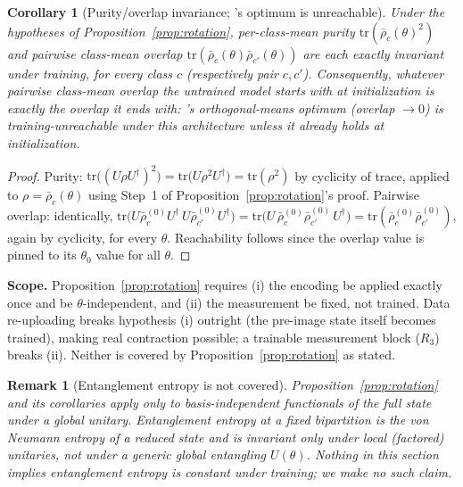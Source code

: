 \documentclass[pdflatex,sn-mathphys-ay]{sn-jnl}
\theoremstyle{thmstyleone}
\newtheorem{corollary}[theorem]{Corollary}
\theoremstyle{thmstyletwo}
\newtheorem{remark}{Remark}
\begin{document}
\begin{corollary}[Purity/overlap invariance; \citeauthor{du2023}'s optimum is unreachable]
\label{cor:purity}
Under the hypotheses of Proposition~\ref{prop:rotation}, per-class-mean purity $\mathrm{tr}(\bar\rho_c(\theta)^2)$ and pairwise class-mean overlap $\mathrm{tr}(\bar\rho_c(\theta)\bar\rho_{c'}(\theta))$ are each exactly invariant under training, for every class $c$ (respectively pair $c,c'$). Consequently, whatever pairwise class-mean overlap the untrained model starts with at initialization is exactly the overlap it ends with: \citeauthor{du2023}'s orthogonal-means optimum (overlap $\to 0$) is \emph{training-unreachable} under this architecture unless it already holds at initialization.
\end{corollary}
\begin{proof}
Purity: $\mathrm{tr}\big((U\rho U^\dagger)^2\big) = \mathrm{tr}\big(U\rho^2 U^\dagger\big) = \mathrm{tr}(\rho^2)$ by cyclicity of trace, applied to $\rho=\bar\rho_c(\theta)$ using Step~1 of Proposition~\ref{prop:rotation}'s proof. Pairwise overlap: identically, $\mathrm{tr}\big(U\bar\rho_c^{(0)}U^\dagger\,U\bar\rho_{c'}^{(0)}U^\dagger\big) = \mathrm{tr}\big(U\,\bar\rho_c^{(0)}\bar\rho_{c'}^{(0)}\,U^\dagger\big) = \mathrm{tr}(\bar\rho_c^{(0)}\bar\rho_{c'}^{(0)})$, again by cyclicity, for every $\theta$. Reachability follows since the overlap value is pinned to its $\theta_0$ value for all $\theta$.
\end{proof}

\noindent\textbf{Scope.} Proposition~\ref{prop:rotation} requires (i) the encoding be applied exactly once and be $\theta$-independent, and (ii) the measurement be fixed, not trained. Data re-uploading breaks hypothesis (i) outright (the pre-image state itself becomes trained), making real contraction possible; a trainable measurement block ($R_3$) breaks (ii). Neither is covered by Proposition~\ref{prop:rotation} as stated.

\begin{remark}[Entanglement entropy is not covered]
\label{rem:entropy}
Proposition~\ref{prop:rotation} and its corollaries apply only to basis-independent functionals of the full state under a \emph{global} unitary. Entanglement entropy at a fixed bipartition is the von Neumann entropy of a reduced state and is invariant only under \emph{local} (factored) unitaries, not under a generic global entangling $U(\theta)$. Nothing in this section implies entanglement entropy is constant under training; we make no such claim.
\end{remark}
\end{document}
